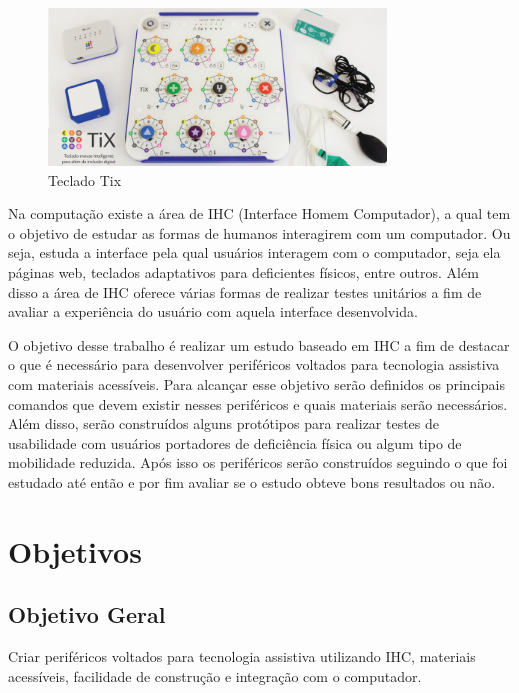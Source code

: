 \documentclass[
	12pt,			%
	openright,		%
	oneside,			%
	a4paper,			%
	chapter=TITLE,		%
	english,			%
	brazil,			%
	]{abntex2}
\begin{document}
\begin{figure}[H]
  \centering
		\includegraphics[width=0.8\textwidth]{./img/img-14.png}
		\caption{Teclado Tix}
		\label{img:img-14-2}
\end{figure}

Na computação existe a área de IHC (Interface Homem Computador), a qual tem o objetivo de estudar as formas de humanos interagirem com um computador. Ou seja, estuda a interface pela qual usuários interagem com o computador, seja ela páginas web, teclados adaptativos para deficientes físicos, entre outros. Além disso a área de IHC oferece várias formas de realizar testes unitários a fim de avaliar a experiência do usuário com aquela interface desenvolvida.

O objetivo desse trabalho é realizar um estudo baseado em IHC a fim de destacar o que é necessário para desenvolver periféricos voltados para tecnologia assistiva com materiais acessíveis. Para alcançar esse objetivo serão definidos os principais comandos que devem existir nesses periféricos e quais materiais serão necessários. Além disso, serão construídos alguns protótipos para realizar testes de usabilidade com usuários portadores de deficiência física ou algum tipo de mobilidade reduzida. Após isso os periféricos serão construídos seguindo o que foi estudado até então e por fim avaliar se o estudo obteve bons resultados ou não.

\section{Objetivos}
\label{obj}

\subsection{Objetivo Geral}
Criar periféricos voltados para tecnologia assistiva utilizando IHC, materiais acessíveis, facilidade de construção e integração com o computador.
\end{document}
